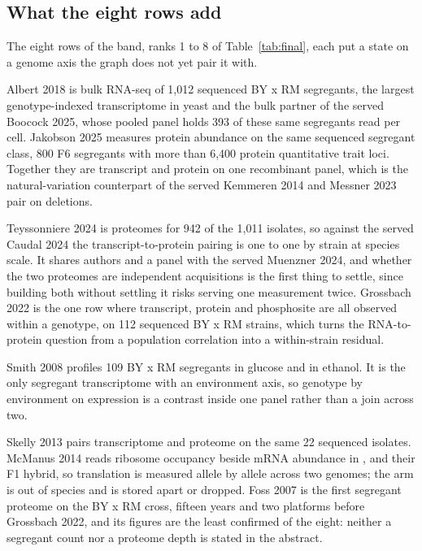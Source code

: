\subsection{What the eight rows add}\label{sec:state-rows}

The eight rows of the band, ranks 1 to 8 of Table~\ref{tab:final}, each put a state on a
genome axis the graph does not yet pair it with.

 Albert 2018 is bulk RNA-seq of
1,012 sequenced BY x RM segregants, the largest genotype-indexed transcriptome in yeast and
the bulk partner of the served Boocock 2025, whose pooled panel holds 393 of these same
segregants read per cell. Jakobson 2025 measures protein abundance on the same sequenced
segregant class, 800 F6 segregants with more than 6,400 protein quantitative trait loci.
Together they are transcript and protein on one recombinant panel, which is the
natural-variation counterpart of the served Kemmeren 2014 and Messner 2023 pair on
deletions.

 Teyssonniere 2024 is
proteomes for 942 of the 1,011 isolates, so against the served Caudal 2024 the
transcript-to-protein pairing is one to one by strain at species scale. It shares authors
and a panel with the served Muenzner 2024, and whether the two proteomes are independent
acquisitions is the first thing to settle, since building both without settling it risks
serving one measurement twice. Grossbach 2022 is the one row where transcript, protein and
phosphosite are all observed within a genotype, on 112 sequenced BY x RM strains, which
turns the RNA-to-protein question from a population correlation into a within-strain
residual.

 Smith 2008 profiles 109 BY x RM segregants in
glucose and in ethanol. It is the only segregant transcriptome with an environment axis,
so genotype by environment on expression is a contrast inside one panel rather than a join
across two.

 Skelly 2013 pairs
transcriptome and proteome on the same 22 sequenced isolates. McManus 2014 reads ribosome
occupancy beside mRNA abundance in ,  and their F1
hybrid, so translation is measured allele by allele across two genomes; the
 arm is out of species and is stored apart or dropped. Foss 2007 is the
first segregant proteome on the BY x RM cross, fifteen years and two platforms before
Grossbach 2022, and its figures are the least confirmed of the eight: neither a segregant
count nor a proteome depth is stated in the abstract.

